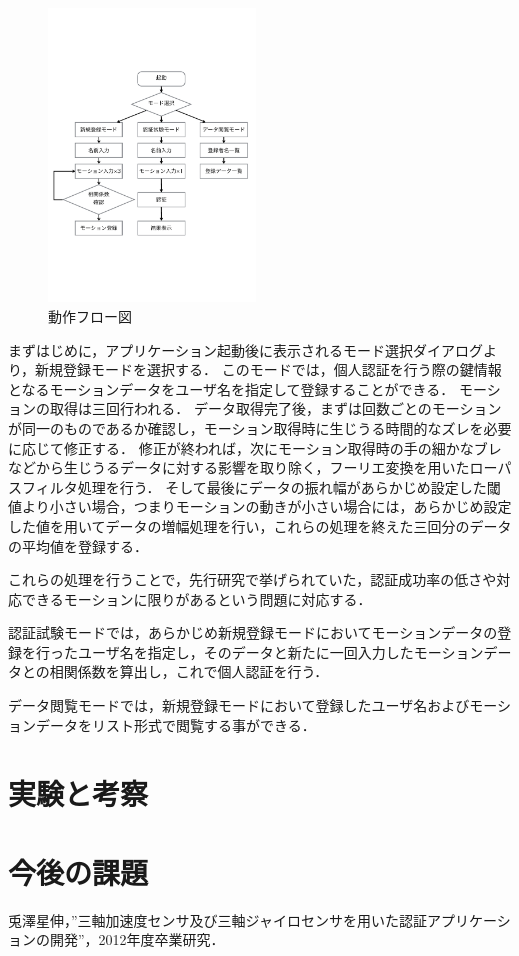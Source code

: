 \documentclass[11pt]{jarticle}
\begin{document}
\begin{figure}
    \begin{center}
        \includegraphics[width=55mm, bb=0 183 594 670]{Flow.pdf}
        \caption{動作フロー図}
        \label{flow}
    \end{center}
\end{figure}

まずはじめに，アプリケーション起動後に表示されるモード選択ダイアログより，新規登録モードを選択する．
このモードでは，個人認証を行う際の鍵情報となるモーションデータをユーザ名を指定して登録することができる．
モーションの取得は三回行われる．
データ取得完了後，まずは回数ごとのモーションが同一のものであるか確認し，モーション取得時に生じうる時間的なズレを必要に応じて修正する．
修正が終われば，次にモーション取得時の手の細かなブレなどから生じうるデータに対する影響を取り除く，フーリエ変換を用いたローパスフィルタ処理を行う．
そして最後にデータの振れ幅があらかじめ設定した閾値より小さい場合，つまりモーションの動きが小さい場合には，あらかじめ設定した値を用いてデータの増幅処理を行い，これらの処理を終えた三回分のデータの平均値を登録する．

これらの処理を行うことで，先行研究で挙げられていた，認証成功率の低さや対応できるモーションに限りがあるという問題に対応する．

認証試験モードでは，あらかじめ新規登録モードにおいてモーションデータの登録を行ったユーザ名を指定し，そのデータと新たに一回入力したモーションデータとの相関係数を算出し，これで個人認証を行う．

データ閲覧モードでは，新規登録モードにおいて登録したユーザ名およびモーションデータをリスト形式で閲覧する事ができる．

\section{実験と考察}

\section{今後の課題}

\begin{thebibliography}{9}
    兎澤星伸，”三軸加速度センサ及び三軸ジャイロセンサを用いた認証アプリケーションの開発”，2012年度卒業研究．
\end{thebibliography}
\end{document}
